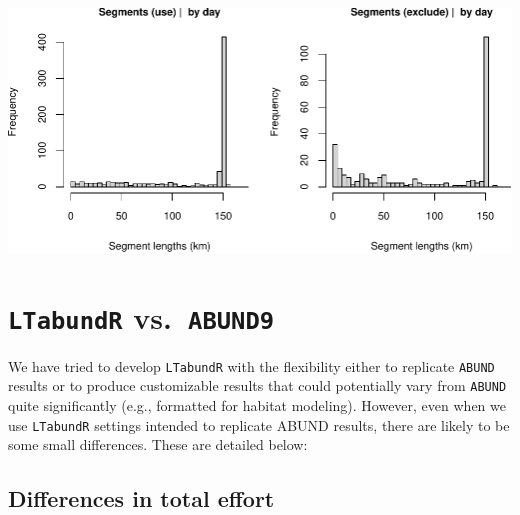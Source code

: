 \documentclass[
]{book}
\begin{document}
\includegraphics{figures/unnamed-chunk-382-1.pdf}

\hypertarget{abund9_compare}{%
\chapter{\texorpdfstring{\texttt{LTabundR} vs.~\texttt{ABUND9}}{LTabundR vs.~ABUND9}}\label{abund9_compare}}

We have tried to develop \texttt{LTabundR} with the flexibility either to replicate \texttt{ABUND} results or to produce customizable results that could potentially vary from \texttt{ABUND} quite significantly (e.g., formatted for habitat modeling). However, even when we use \texttt{LTabundR} settings intended to replicate ABUND results, there are likely to be some small differences. These are detailed below:

\hypertarget{differences-in-total-effort}{%
\section*{Differences in total effort}\label{differences-in-total-effort}}
\end{document}
